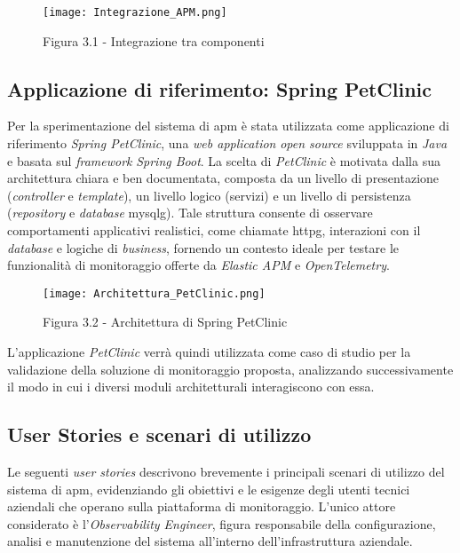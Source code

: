 \begin{figure}[!h] 
    \centering 
    \texttt{[image: Integrazione\_APM.png]} 
    \caption{Figura 3.1 - Integrazione tra componenti}
\end{figure}


\subsection{Applicazione di riferimento: Spring PetClinic}
Per la sperimentazione del sistema di \gls{apm} è stata utilizzata come applicazione di riferimento \emph{Spring PetClinic}, una \emph{web application} \emph{open source} sviluppata in \emph{Java} e basata sul \emph{framework} \emph{Spring Boot}.  
La scelta di \emph{PetClinic} è motivata dalla sua architettura chiara e ben documentata, composta da un livello di presentazione (\emph{controller} e \emph{template}), un livello logico (servizi) e un livello di persistenza (\emph{repository} e \emph{database} \gls{mysqlg}\glsfirstoccur).  
Tale struttura consente di osservare comportamenti applicativi realistici, come chiamate \gls{httpg}\glsfirstoccur, interazioni con il \emph{database} e logiche di \emph{business}, fornendo un contesto ideale per testare le funzionalità di monitoraggio offerte da \emph{Elastic APM} e \emph{OpenTelemetry}.  

\begin{figure}[!h] 
    \centering 
    \texttt{[image: Architettura\_PetClinic.png]} 
    \caption{Figura 3.2 - Architettura di Spring PetClinic}
\end{figure}


L'applicazione \emph{PetClinic} verrà quindi utilizzata come caso di studio per la validazione della soluzione di monitoraggio proposta, analizzando successivamente il modo in cui i diversi moduli architetturali interagiscono con essa.
\newpage

\subsection{User Stories e scenari di utilizzo}
Le seguenti \emph{user stories} descrivono brevemente i principali scenari di utilizzo del sistema di \gls{apm}, evidenziando gli obiettivi e le esigenze degli utenti tecnici aziendali che operano sulla piattaforma di monitoraggio.  
L'unico attore considerato è l'\emph{Observability Engineer}, figura responsabile della configurazione, analisi e manutenzione del sistema all'interno dell'infrastruttura aziendale.

